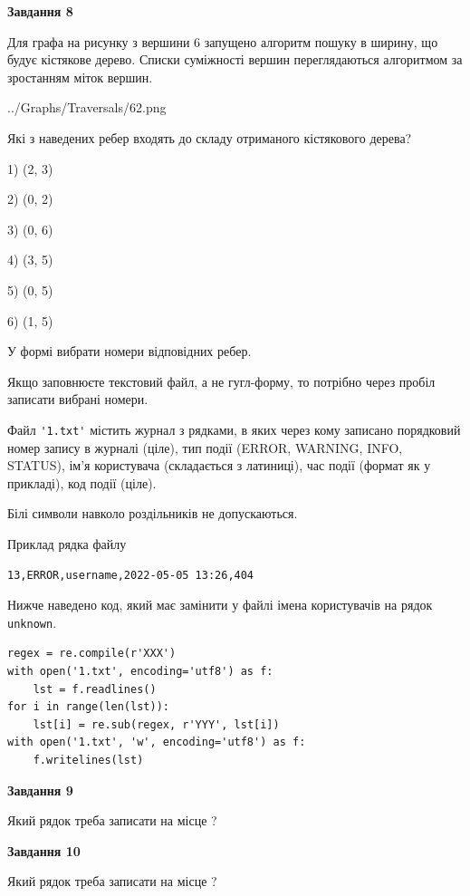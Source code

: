 \documentclass[12pt, ukrainian]{article}
\def\code#1{\Verb!#1!}
\begin{document}
{\begin {large}
{\begin {center}\textbf{Завдання 8}\end {center}}\par
Для графа на рисунку з вершини 6 запущено алгоритм пошуку в ширину, що будує кістякове дерево. Списки суміжності вершин переглядаються алгоритмом за зростанням міток вершин.\par
\begin{center}
	{../Graphs/Traversals/62.png}
\end{center}
\par Які з наведених ребер входять до складу отриманого кістякового дерева?\par
1) (2, 3)\par
2) (0, 2)\par
3) (0, 6)\par
4) (3, 5)\par
5) (0, 5)\par
6) (1, 5)\par
{\vskip 15pt} У формі вибрати номери відповідних ребер.


Якщо заповнюєте текстовий файл, а не гугл-форму, то потрібно через пробіл записа\-ти вибрані номери.\par
\newpage


Файл \code{'1.txt'} містить журнал з рядками, в яких через кому записано поряд\-ко\-вий номер запису в журналі (ціле), тип події (ERROR, WARNING, INFO, STATUS), ім'я користувача (складається з латиниці), час події (фор\-мат як у прикладі), код події (ціле).

Білі символи навколо роздільників не допускаються.

Приклад рядка файлу



\begin{verbatim}
13,ERROR,username,2022-05-05 13:26,404
\end{verbatim}


Нижче наведено код, який має замінити у файлі імена користувачів на рядок \code{unknown}.



\begin{verbatim}
regex = re.compile(r'XXX')
with open('1.txt', encoding='utf8') as f:
    lst = f.readlines()
for i in range(len(lst)):
    lst[i] = re.sub(regex, r'YYY', lst[i])
with open('1.txt', 'w', encoding='utf8') as f:
    f.writelines(lst)
\end{verbatim}




{\begin {center}\textbf{Завдання 9}\end {center}}\par
Який рядок треба записати на місце  ?\par
\vspace{5mm}


{\begin {center}\textbf{Завдання 10}\end {center}}\par
Який рядок треба записати на місце  ?\par


\newpage


\end {large}}
\end{document}
